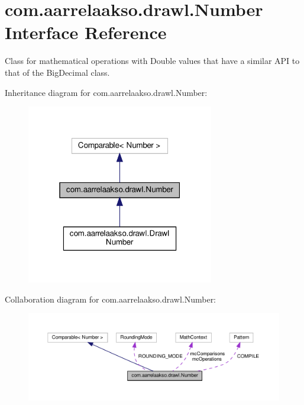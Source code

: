 \hypertarget{interfacecom_1_1aarrelaakso_1_1drawl_1_1_number}{}\section{com.\+aarrelaakso.\+drawl.\+Number Interface Reference}
\label{interfacecom_1_1aarrelaakso_1_1drawl_1_1_number}


Class for mathematical operations with Double values that have a similar A\+PI to that of the Big\+Decimal class.  




Inheritance diagram for com.\+aarrelaakso.\+drawl.\+Number\+:\nopagebreak
\begin{figure}[H]
\begin{center}
\leavevmode
\includegraphics[width=232pt]{d5/de2/interfacecom_1_1aarrelaakso_1_1drawl_1_1_number__inherit__graph}
\end{center}
\end{figure}


Collaboration diagram for com.\+aarrelaakso.\+drawl.\+Number\+:\nopagebreak
\begin{figure}[H]
\begin{center}
\leavevmode
\includegraphics[width=350pt]{df/d78/interfacecom_1_1aarrelaakso_1_1drawl_1_1_number__coll__graph}
\end{center}
\end{figure}
